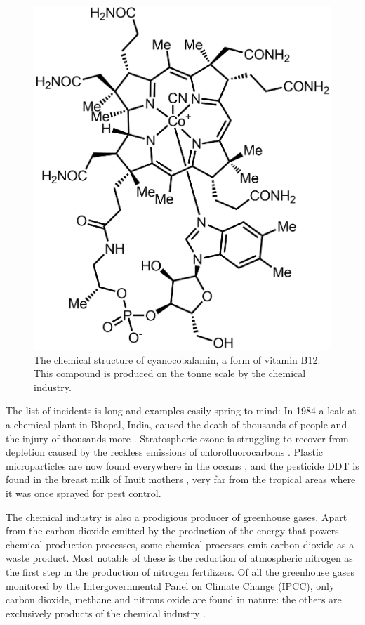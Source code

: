 \begin{figure}
\centering
\includegraphics[width=\textwidth]{Figures/Cyanocobalamin-b12.png}
\decoRule

\caption[Cyanocobalamin]{The chemical structure of cyanocobalamin, a form of
vitamin B12. This compound is produced on the tonne scale by the chemical
industry.}

\label{fig:vitb12}

\end{figure}

The list of incidents is long and examples easily spring to mind: In 1984 a leak
at a chemical plant in Bhopal, India, caused the death of thousands of people
and the injury of thousands more \autocite{Varma2005}.
Stratospheric ozone is struggling to recover from depletion caused by the
reckless emissions of chlorofluorocarbons \autocite{Ball2018}. Plastic
microparticles are now found everywhere in the oceans \autocite{Woodall2014},
and the pesticide DDT is found in the breast milk of Inuit mothers
\autocite{Gibson2016}, very far from the tropical areas where it was once
sprayed for pest control.

The chemical industry is also a prodigious producer of greenhouse gases. Apart
from the carbon dioxide emitted by the production of the energy that powers
chemical production processes, some chemical processes emit carbon dioxide as a
waste product. Most notable of these is the reduction of atmospheric nitrogen as
the first step in the production of nitrogen fertilizers. Of all the greenhouse
gases monitored by the Intergovernmental Panel on Climate Change (IPCC), only
carbon dioxide, methane and nitrous oxide are found in nature: the others are
exclusively products of the chemical industry \autocite{IPCC2014}.

